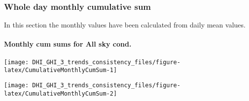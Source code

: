\documentclass[
  10pt,
  a4paper,oneside]{article}
\begin{document}
\hypertarget{whole-day-monthly-cumulative-sum}{%
\subsubsection{Whole day monthly cumulative sum}\label{whole-day-monthly-cumulative-sum}}

In this section the monthly values have been calculated from daily mean values.

\newpage

\hypertarget{monthly-cum-sums-for-all-sky-cond.}{%
\paragraph{Monthly cum sums for All sky cond.}\label{monthly-cum-sums-for-all-sky-cond.}}

\begin{center}\texttt{[image: DHI\_GHI\_3\_trends\_consistency\_files/figure-latex/CumulativeMonthlyCumSum-1]} \end{center}

\begin{center}\texttt{[image: DHI\_GHI\_3\_trends\_consistency\_files/figure-latex/CumulativeMonthlyCumSum-2]} \end{center}

\newpage

\footnotesize
\end{document}
